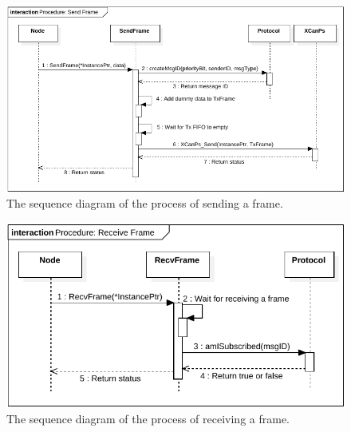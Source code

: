 \begin{figure}[h!]
	\centering
	\includegraphics[width = 1.1\linewidth]{graphics/SeqDiagram_SendFrame.pdf}
	\caption{The sequence diagram of the process of sending a frame.}
	\label{fig:SeqDiagram_SendFrame}
\end{figure}

\begin{figure}[h!]
	\centering
	\includegraphics[width = 1.1\linewidth]{graphics/SeqDiagram_RecvFrame.pdf}
	\caption{The sequence diagram of the process of receiving a frame.}
	\label{fig:SeqDiagram_RecvFrame}
\end{figure}